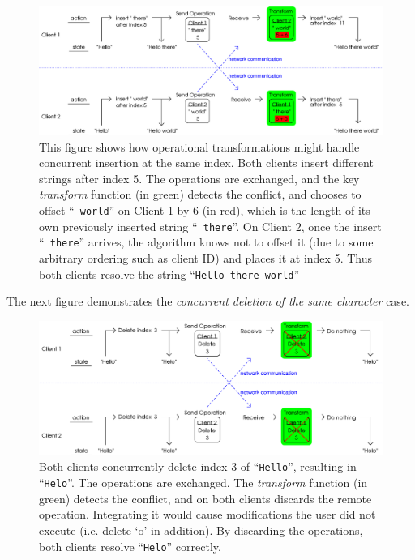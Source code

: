 \documentclass[12pt,a4paper,twoside,openright]{report}
\begin{document}
	\begin{figure}[H]
	\centering
	\includegraphics[width=1\linewidth]{figs/ot1.eps}
	\caption[Operational Transformations --- concurrent insertion]{This figure shows how operational transformations might handle concurrent insertion at the same index. Both clients insert different strings after index 5. The operations are exchanged, and the key \textit{transform} function (in green) detects the conflict, and chooses to offset ``\texttt{ world}'' on Client 1 by 6 (in red), which is the length of its own previously inserted string ``\texttt{ there}''. On Client 2, once the insert ``\texttt{ there}'' arrives, the algorithm knows not to offset it (due to some arbitrary ordering such as client ID) and places it at index 5. Thus both clients resolve the string ``\texttt{Hello there world}''}
	\label{fig:ot1}
	\end{figure}
	
	The next figure demonstrates the \textit{concurrent deletion of the same character} case.

	\begin{figure}[H]
	\centering
	\includegraphics[width=1\linewidth]{figs/ot2.eps}
	\caption[Operational Transformations --- concurrent deletion]{Both clients concurrently delete index 3 of ``\texttt{Hello}'', resulting in ``\texttt{Helo}''. The operations are exchanged. The \textit{transform} function (in green) detects the conflict, and on both clients discards the remote operation. Integrating it would cause modifications the user did not execute (i.e. delete `o' in addition). By discarding the operations, both clients resolve ``\texttt{Helo}'' correctly.}
	\label{fig:ot2}
	\end{figure}
	
\end{document}
